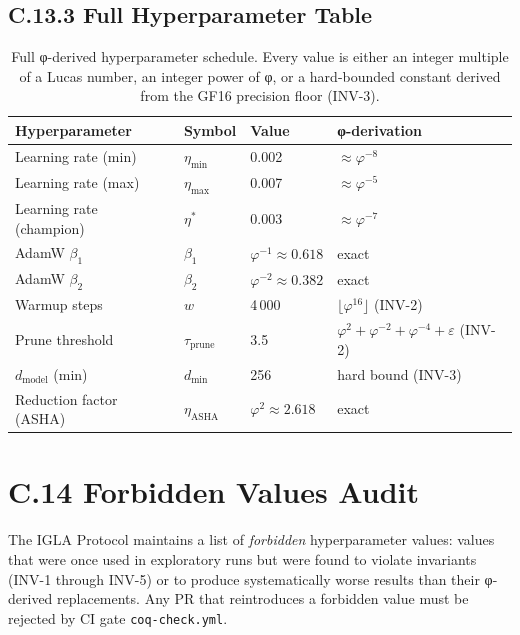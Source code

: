 \subsection*{C.13.3 Full Hyperparameter Table}

\begin{table}[h]
\centering
\begin{tabular}{llll}
\toprule
\textbf{Hyperparameter} & \textbf{Symbol} & \textbf{Value} &
\textbf{φ-derivation} \\
\midrule
Learning rate (min)    & $\eta_{\min}$    & 0.002
  & $\approx \varphi^{-8}$ \\
Learning rate (max)    & $\eta_{\max}$    & 0.007
  & $\approx \varphi^{-5}$ \\
Learning rate (champion)& $\eta^*$        & 0.003
  & $\approx \varphi^{-7}$ \\
AdamW $\beta_1$        & $\beta_1$        & $\varphi^{-1} \approx 0.618$
  & exact \\
AdamW $\beta_2$        & $\beta_2$        & $\varphi^{-2} \approx 0.382$
  & exact \\
Warmup steps           & $w$              & 4\,000
  & $\lfloor \varphi^{16} \rfloor$ (INV-2) \\
Prune threshold        & $\tau_{\text{prune}}$ & 3.5
  & $\varphi^2 + \varphi^{-2} + \varphi^{-4} + \varepsilon$
    (INV-2) \\
$d_\text{model}$ (min) & $d_{\min}$       & 256
  & hard bound (INV-3) \\
Reduction factor (ASHA)& $\eta_{\text{ASHA}}$ & $\varphi^2 \approx 2.618$
  & exact \\
\bottomrule
\end{tabular}
\caption{Full φ-derived hyperparameter schedule.  Every value is either
an integer multiple of a Lucas number, an integer power of φ, or a
hard-bounded constant derived from the GF16 precision floor (INV-3).}
\end{table}

\section*{C.14 Forbidden Values Audit}
\label{sec:forbidden-values}

The IGLA Protocol maintains a list of \emph{forbidden} hyperparameter
values: values that were once used in exploratory runs but were found
to violate invariants (INV-1 through INV-5) or to produce systematically
worse results than their φ-derived replacements.  Any PR that
reintroduces a forbidden value must be rejected by CI gate
\texttt{coq-check.yml}.

